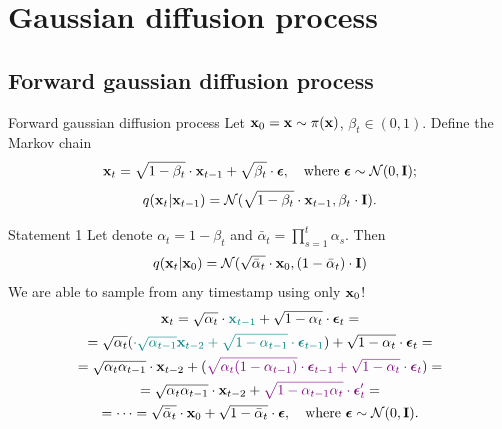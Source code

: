 \section{Gaussian diffusion process}
\subsection{Forward gaussian diffusion process}
\begin{frame}{Forward gaussian diffusion process}
	Let $\mathbf{x}_0 = \mathbf{x} \sim \pi(\mathbf{x})$, $\beta_t \in (0, 1)$. Define the Markov chain
	\[
		\mathbf{x}_t = \sqrt{1 - \beta_t} \cdot \mathbf{x}_{t - 1} + \sqrt{\beta_t} \cdot \boldsymbol{\epsilon}, \quad \text{where }\boldsymbol{\epsilon} \sim \mathcal{N}(0, \mathbf{I});
	\]
	\[
		q(\mathbf{x}_t | \mathbf{x}_{t-1}) = \mathcal{N}(\sqrt{1 - \beta_t} \cdot \mathbf{x}_{t-1}, \beta_t \cdot \mathbf{I}).
	\]
	\vspace{-0.5cm}
	\begin{block}{Statement 1}
		Let denote $\alpha_t = 1 - \beta_t$ and $\bar{\alpha}_t = \prod_{s=1}^t \alpha_s$. Then
		\[
			q(\mathbf{x}_t | \mathbf{x}_0) = \mathcal{N}(\sqrt{\bar{\alpha}_t} \cdot \mathbf{x}_0, (1 - \bar{\alpha}_t) \cdot \mathbf{I})
		\]
		We are able to sample from any timestamp using only $\mathbf{x}_0$!
		\vspace{-0.2cm}
		{\small
		\begin{multline*}
			\mathbf{x}_t = \sqrt{\alpha_t} \cdot {\color{teal}\mathbf{x}_{t-1}} + \sqrt{1 - \alpha_t} \cdot \boldsymbol{\epsilon}_t = \\
			= \sqrt{\alpha_t} ({\color{teal} \cdot \sqrt{\alpha_{t-1}} \mathbf{x}_{t-2} + \sqrt{1 - \alpha_{t-1}} \cdot  \boldsymbol{\epsilon}_{t-1}}) + \sqrt{1 - \alpha_t} \cdot \boldsymbol{\epsilon}_t = \\
			= \sqrt{\alpha_t \alpha_{t-1}} \cdot \mathbf{x}_{t-2} + ( {\color{violet}\sqrt{\alpha_t (1 - \alpha_{t-1})} \cdot  \boldsymbol{\epsilon}_{t-1} + \sqrt{1 - \alpha_t} \cdot \boldsymbol{\epsilon}_t}) = \\
			= \sqrt{\alpha_t \alpha_{t-1}} \cdot \mathbf{x}_{t-2} + {\color{violet}\sqrt{1 - \alpha_{t-1} \alpha_t} \cdot \boldsymbol{\epsilon}'_t} = \\
			 = \dots = \sqrt{\bar{\alpha}_t} \cdot \mathbf{x}_{0} + \sqrt{1 - \bar{\alpha}_t} \cdot \boldsymbol{\epsilon}, \quad \text{where } \boldsymbol{\epsilon} \sim \mathcal{N}(0, \mathbf{I}).
		\end{multline*}
		}
	\end{block}
 \end{frame}
